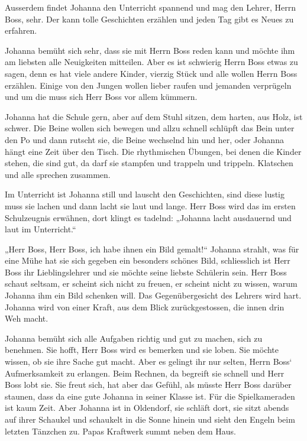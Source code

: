 \documentclass[10pt,titlepage,a5paper]{book}
\begin{document}
Ausserdem findet Johanna den Unterricht spannend und mag den Lehrer, Herrn Boss, sehr. Der kann tolle Geschichten erzählen und jeden Tag gibt es Neues zu erfahren. 

Johanna bemüht sich sehr, dass sie mit Herrn Boss reden kann und möchte ihm am liebsten alle Neuigkeiten mitteilen. Aber es ist schwierig Herrn Boss etwas zu sagen, denn es hat viele andere Kinder, vierzig Stück und alle wollen Herrn Boss erzählen. Einige von den Jungen wollen lieber raufen und jemanden verprügeln und um die muss sich Herr Boss vor allem kümmern.

Johanna hat die Schule gern, aber auf dem Stuhl sitzen, dem harten, aus Holz, ist schwer. Die Beine wollen sich bewegen und allzu schnell schlüpft das Bein unter den Po und dann rutscht sie, die Beine wechselnd hin und her, oder Johanna hängt eine Zeit über den Tisch. Die rhythmischen Übungen, bei denen die Kinder stehen, die sind gut, da darf sie stampfen und trappeln und trippeln. Klatschen und alle sprechen zusammen.

Im Unterricht ist Johanna still und lauscht den Geschichten, sind diese lustig muss sie lachen und dann lacht sie laut und lange. Herr Boss wird das im ersten Schulzeugnis erwähnen, dort klingt es tadelnd: „Johanna lacht ausdauernd und laut im Unterricht.“

„Herr Boss, Herr Boss, ich habe ihnen ein Bild gemalt!“ Johanna strahlt, was für eine Mühe hat sie sich gegeben ein besonders schönes Bild, schliesslich ist Herr Boss ihr Lieblingslehrer und sie möchte seine liebste Schülerin sein. Herr Boss schaut seltsam, er scheint sich nicht zu freuen, er scheint nicht zu wissen, warum Johanna ihm ein Bild schenken will. Das Gegenübergesicht des Lehrers wird hart. Johanna wird von einer Kraft, aus dem Blick zurückgestossen, die innen drin Weh macht.

Johanna bemüht sich alle Aufgaben richtig und gut zu machen, sich zu benehmen. Sie hofft, Herr Boss wird es bemerken und sie loben. Sie möchte wissen, ob sie ihre Sache gut macht. Aber es gelingt ihr nur selten, Herrn Boss` Aufmerksamkeit  zu erlangen. Beim Rechnen, da begreift sie schnell und Herr Boss lobt sie. Sie freut sich, hat aber das Gefühl, als müsste Herr Boss darüber staunen, dass da eine gute Johanna in seiner Klasse ist.
Für die Spielkameraden ist kaum Zeit. Aber Johanna ist in Oldendorf, sie schläft dort, sie sitzt abends auf ihrer Schaukel und schaukelt in die Sonne hinein und sieht den Engeln beim letzten Tänzchen zu. Papas Kraftwerk summt neben dem Haus.
\end{document}
